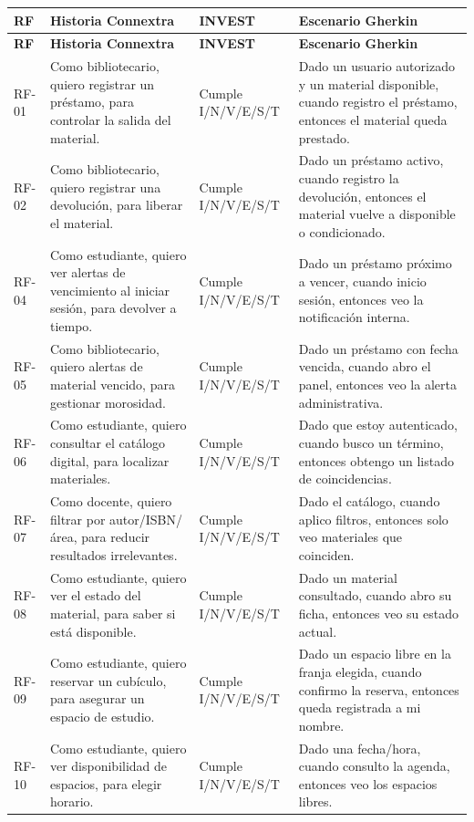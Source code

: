 \documentclass[12pt,journal,onecolumn]{IEEEtran}
\begin{document}
\begin{longtable}{P{0.09\textwidth}P{0.30\textwidth}P{0.18\textwidth}P{0.35\textwidth}}\toprule
\textbf{RF} & \textbf{Historia Connextra} & \textbf{INVEST} & \textbf{Escenario Gherkin}\\\midrule\endfirsthead
\toprule\textbf{RF} & \textbf{Historia Connextra} & \textbf{INVEST} & \textbf{Escenario Gherkin}\\\midrule\endhead
RF-01 & Como bibliotecario, quiero registrar un préstamo, para controlar la salida del material. & Cumple I/N/V/E/S/T & Dado un usuario autorizado y un material disponible, cuando registro el préstamo, entonces el material queda prestado.\\
RF-02 & Como bibliotecario, quiero registrar una devolución, para liberar el material. & Cumple I/N/V/E/S/T & Dado un préstamo activo, cuando registro la devolución, entonces el material vuelve a disponible o condicionado.\\
RF-04 & Como estudiante, quiero ver alertas de vencimiento al iniciar sesión, para devolver a tiempo. & Cumple I/N/V/E/S/T & Dado un préstamo próximo a vencer, cuando inicio sesión, entonces veo la notificación interna.\\
RF-05 & Como bibliotecario, quiero alertas de material vencido, para gestionar morosidad. & Cumple I/N/V/E/S/T & Dado un préstamo con fecha vencida, cuando abro el panel, entonces veo la alerta administrativa.\\
RF-06 & Como estudiante, quiero consultar el catálogo digital, para localizar materiales. & Cumple I/N/V/E/S/T & Dado que estoy autenticado, cuando busco un término, entonces obtengo un listado de coincidencias.\\
RF-07 & Como docente, quiero filtrar por autor/ISBN/área, para reducir resultados irrelevantes. & Cumple I/N/V/E/S/T & Dado el catálogo, cuando aplico filtros, entonces solo veo materiales que coinciden.\\
RF-08 & Como estudiante, quiero ver el estado del material, para saber si está disponible. & Cumple I/N/V/E/S/T & Dado un material consultado, cuando abro su ficha, entonces veo su estado actual.\\
RF-09 & Como estudiante, quiero reservar un cubículo, para asegurar un espacio de estudio. & Cumple I/N/V/E/S/T & Dado un espacio libre en la franja elegida, cuando confirmo la reserva, entonces queda registrada a mi nombre.\\
RF-10 & Como estudiante, quiero ver disponibilidad de espacios, para elegir horario. & Cumple I/N/V/E/S/T & Dado una fecha/hora, cuando consulto la agenda, entonces veo los espacios libres.\\

\end{longtable}
\end{document}
